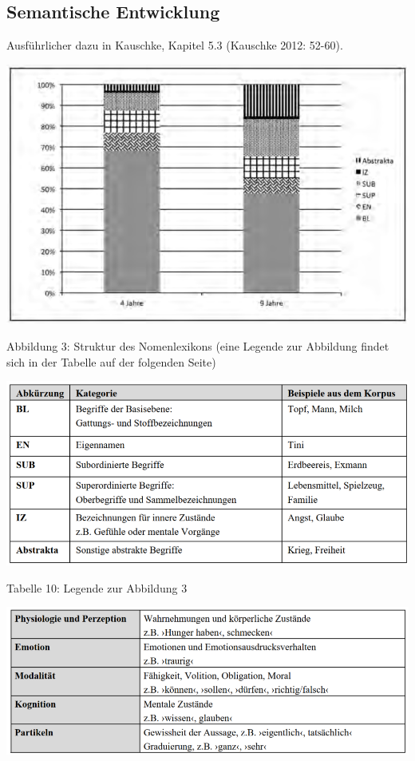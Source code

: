 \documentclass[
  letterpaper,
]{scrbook}
\begin{document}
\hypertarget{semantische-entwicklung}{%
\subsection{Semantische Entwicklung}\label{semantische-entwicklung}}

Ausführlicher dazu in Kauschke, Kapitel 5.3 (Kauschke 2012: 52-60).

\includegraphics[width=1\textwidth,height=\textheight]{./pictures/kauschke_abb3.png}

Abbildung 3: Struktur des Nomenlexikons (eine Legende zur Abbildung
findet sich in der Tabelle auf der folgenden Seite)

\includegraphics[width=1\textwidth,height=\textheight]{./pictures/kauschke_tab10.png}

Tabelle 10: Legende zur Abbildung 3

\includegraphics[width=1\textwidth,height=\textheight]{./pictures/kauschke_tab11.png}
\end{document}
